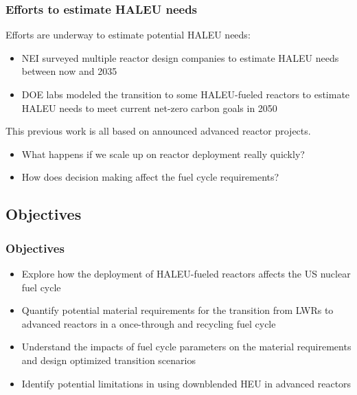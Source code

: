 \begin{frame}
    \frametitle{Efforts to estimate HALEU needs}
    Efforts are underway to estimate potential \gls{HALEU} needs:
    \begin{itemize}
        \item \gls{NEI} surveyed multiple reactor design companies
              to estimate \gls{HALEU} needs between now and 2035 
              \cite{korsnick_updated_2021,nuclear_energy_institute_establishing_2022}
        \item \gls{DOE} labs modeled the transition to some 
              \gls{HALEU}-fueled reactors to estimate \gls{HALEU} needs 
              to meet current net-zero carbon goals in 2050 \cite{dixon_estimated_2022}
    \end{itemize}
    \pause
    This previous work is all based on announced advanced reactor projects.
    \begin{itemize}
        \item What happens if we scale up on reactor deployment really quickly?
        \item How does decision making affect the fuel cycle requirements?
    \end{itemize}
\end{frame}

\subsection{Objectives}
\begin{frame}
    \frametitle{Objectives}
        \begin{itemize}
        \item Explore how the deployment of \gls{HALEU}-fueled reactors 
              affects the US nuclear fuel cycle
        \item Quantify potential material requirements for the transition from 
              \glspl{LWR} to advanced reactors in a once-through and recycling 
              fuel cycle
        \item Understand the impacts of fuel cycle parameters on the 
              material requirements and design optimized transition scenarios
        \item Identify potential limitations in using downblended \gls{HEU} 
              in advanced reactors
        \end{itemize}
\end{frame}